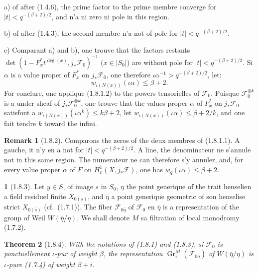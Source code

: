 \documentclass[12pt,a4paper]{article}
\theoremstyle{plain}
\newtheorem{theorem}{Theorem}[section]
\theoremstyle{definition}
\newtheorem{remark}[theorem]{Remark}
\theoremstyle{definition}
\newtheorem{para}{}[section]
\theoremstyle{remark}
\DeclareMathOperator{\Gr}{Gr}
\begin{document}
a) of after (1.4.6), the prime factor to the prime membre converge for $|t| < q^{-(\beta+2)/2}$, and n'a ni zero ni pole in this region.

b) of after (1.4.3), the second membre n'a not of pole for $|t| < q^{-(\beta+2)/2}$.

c) Comparant a) and b), one trouve that the factors restants $\det(1 - F_x^* t^{\deg(x)}, j_* \mathscr{F}_0)^{-1}$ ($x \in |S_0|$) are without pole for $|t| < q^{-(\beta+2)/2}$. Si $\alpha$ is a value proper of $F_x^*$ on $j_* \mathscr{F}_0$, one therefore $\iota\alpha^{-1} > q^{-(\beta+2)/2}$, let:
\begin{equation}\tag{1.8.1.2}
w_{\iota(N(x))}(\iota\alpha) \leq \beta + 2.
\end{equation}
For conclure, one applique (1.8.1.2) to the powers tensorielles of $\mathscr{F}_0$. Puisque $\mathscr{F}_0^{\otimes k}$ is a under-sheaf of $j_* \mathscr{F}_0^{\otimes k}$, one trouve that the values proper $\alpha$ of $F_x^*$ on $j_* \mathscr{F}_0$ satisfont a $w_{\iota(N(x))}(\iota\alpha^k) \leq k\beta + 2$, let $w_{\iota(N(x))}(\iota\alpha) \leq \beta + 2/k$, and one fait tendre $k$ toward the infini.

\begin{remark}[1.8.2]
Comparons the zeros of the deux membres of (1.8.1.1). A gauche, it n'y en a not for $|t| < q^{-(\beta+2)/2}$. A line, the denominateur ne s'annule not in this same region. The numerateur ne can therefore s'y annuler, and, for every value proper $\alpha$ of $F$ on $H_c^1(X, j_* \mathscr{F})$, one has $w_q(\iota\alpha) \leq \beta + 2$.
\end{remark}

\begin{para}[1.8.3]
Let $y \in S$, of image $s$ in $S_0$, $\eta$ the point generique of the trait henselien a field residuel finite $X_{0(s)}$, and $\overline{\eta}$ a point generique geometric of son henselise strict $X_{0(\overline{s})}$ (cf.~(1.7.1)). The fiber $\mathscr{F}_{0\overline{\eta}}$ of $\mathscr{F}_0$ en $\overline{\eta}$ is a representation of the group of Weil $W(\overline{\eta}/\eta)$. We shall denote $M$ sa filtration of local monodromy (1.7.2).
\end{para}

\begin{theorem}[1.8.4]
With the notations of (1.8.1) and (1.8.3), si $\mathscr{F}_0$ is ponctuellement $\iota$-pur of weight $\beta$, the representation $\Gr_i^M(\mathscr{F}_{0\overline{\eta}})$ of $W(\overline{\eta}/\eta)$ is $\iota$-pure (1.7.4) of weight $\beta + i$.
\end{theorem}
\end{document}
